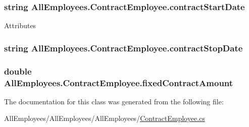 \subsubsection[{contract\+Start\+Date}]{\setlength{\rightskip}{0pt plus 5cm}string All\+Employees.\+Contract\+Employee.\+contract\+Start\+Date}\label{class_all_employees_1_1_contract_employee_a9d7afa5c99e07c161cc8e9581c82b278}
Attributes \hypertarget{class_all_employees_1_1_contract_employee_a94a0d00ca638530a1eb211fcc7411417}{}
\subsubsection[{contract\+Stop\+Date}]{\setlength{\rightskip}{0pt plus 5cm}string All\+Employees.\+Contract\+Employee.\+contract\+Stop\+Date}\label{class_all_employees_1_1_contract_employee_a94a0d00ca638530a1eb211fcc7411417}
\hypertarget{class_all_employees_1_1_contract_employee_a8b9cdb0dd7f6e9cd04baa6c60e6edc63}{}
\subsubsection[{fixed\+Contract\+Amount}]{\setlength{\rightskip}{0pt plus 5cm}double All\+Employees.\+Contract\+Employee.\+fixed\+Contract\+Amount}\label{class_all_employees_1_1_contract_employee_a8b9cdb0dd7f6e9cd04baa6c60e6edc63}


The documentation for this class was generated from the following file\+:\begin{DoxyCompactItemize}
\item 
All\+Employees/\+All\+Employees/\+All\+Employees/\hyperlink{_contract_employee_8cs}{Contract\+Employee.\+cs}\end{DoxyCompactItemize}
